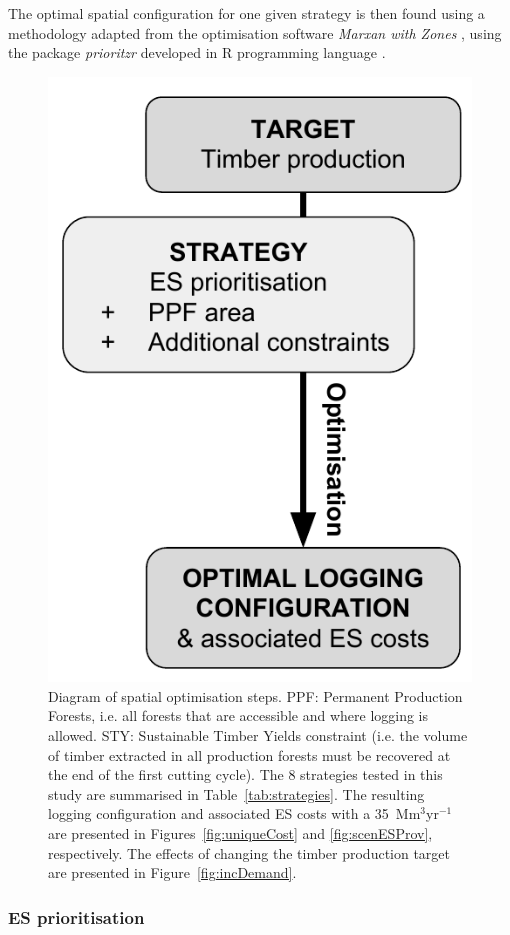 \documentclass{article}
\begin{document}
The optimal spatial configuration for one given strategy is then found using a methodology adapted from the optimisation software \textit{Marxan with Zones} \cite{Watts2009}, using the package \textit{prioritzr} \cite{Hanson2018} developed in R programming language \cite{RCoreTeam2017}. 

\begin{figure}
    \centering
    \includegraphics[width = 0.6\linewidth]{graphs/diagramSpatOptim}
    \caption{Diagram of spatial optimisation steps. PPF: Permanent Production Forests, i.e. all forests that are accessible and where logging is allowed. STY: Sustainable Timber Yields constraint (i.e. the volume of timber extracted in all production forests must be recovered at the end of the first cutting cycle). The 8 strategies tested in this study are summarised in Table~\ref{tab:strategies}. The resulting logging configuration and associated ES costs with a 35~Mm$^3$yr$^{-1}$ are presented in Figures~\ref{fig:uniqueCost} and \ref{fig:scenESProv}, respectively. The effects of changing the timber production target are presented in Figure~\ref{fig:incDemand}.}
    \label{fig:basicDiagram}
\end{figure}

\subsubsection{ES prioritisation}

\label{sec:defPPF}
\end{document}
